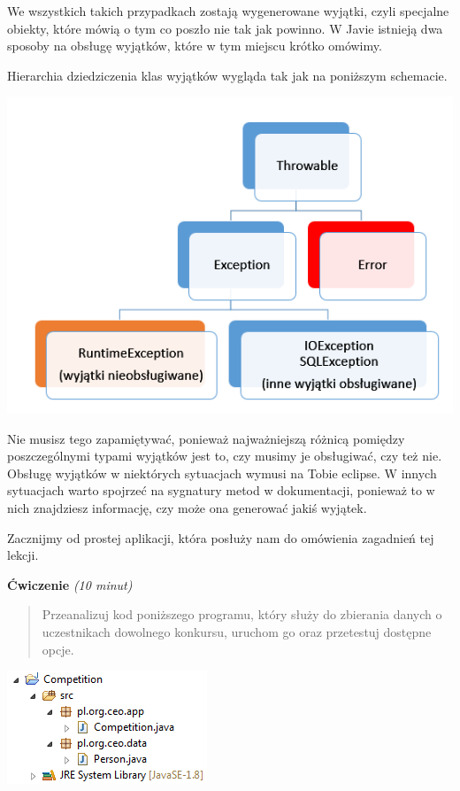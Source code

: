 \documentclass[letterpaper,10pt,english]{sphinxmanual}
\begin{document}
We wszystkich takich przypadkach zostają wygenerowane wyjątki, czyli specjalne obiekty, które mówią o tym co poszło nie tak jak powinno. W Javie istnieją dwa sposoby na obsługę wyjątków, które w tym miejscu krótko omówimy.

Hierarchia dziedziczenia klas wyjątków wygląda tak jak na poniższym schemacie.

{\hfill\includegraphics{exception-hierarchy.png}\hfill}

Nie musisz tego zapamiętywać, ponieważ najważniejszą różnicą pomiędzy poszczególnymi typami wyjątków jest to, czy musimy je obsługiwać, czy też nie. Obsługę wyjątków w niektórych sytuacjach wymusi na Tobie eclipse. W innych sytuacjach warto spojrzeć na sygnatury metod w dokumentacji, ponieważ to w nich znajdziesz informację, czy może ona generować jakiś wyjątek.

Zacznijmy od prostej aplikacji, która posłuży nam do omówienia zagadnień tej lekcji.

\textbf{Ćwiczenie} \emph{(10 minut)}
\begin{quote}

Przeanalizuj kod poniższego programu, który służy do zbierania danych o uczestnikach dowolnego konkursu, uruchom go oraz przetestuj dostępne opcje.
\end{quote}

{\hfill\includegraphics{comp.png}\hfill}
\end{document}
